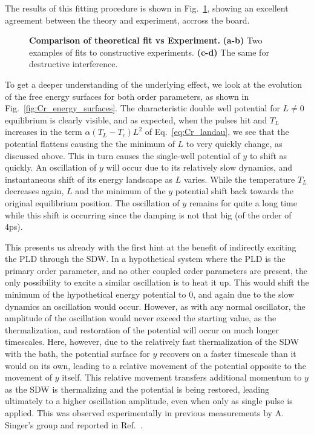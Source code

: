 The results of this fitting procedure is shown in Fig.~\ref{fig:Cr_theoretical_fit}, showing an excellent agreement between the theory and experiment, accross the board.
\begin{figure}
\caption{\label{fig:Cr_theoretical_fit} {\bf Comparison of theoretical fit vs Experiment.} {\bf (a-b)} Two examples of fits to constructive experiments. {\bf (c-d)} The same for destructive interference.}
\end{figure}

To get a deeper understanding of the underlying effect, we look at the evolution of the free energy surfaces for both order parameters, as shown in Fig.~\ref{fig:Cr_energy_surfaces}.
The characteristic double well potential for $L\neq0$ equilibrium is clearly visible, and as expected, when the pulses hit and $T_L$ increases in the term $\alpha(T_L-T_c)L^2$ of Eq.~\ref{eq:Cr_landau}, we see that the potential flattens causing the the minimum of $L$ to very quickly change, as discussed above.
This in turn causes the single-well potential of $y$ to shift as quickly.
An oscillation of $y$ will occur due to its relatively slow dynamics, and instantaneous shift of its energy landscape as $L$ varies.
While the temperature $T_L$ decreases again, $L$ and the minimum of the $y$ potential shift back towards the original equilibrium position.
The oscillation of $y$ remains for quite a long time while this shift is occurring since the damping is not that big (of the order of 4ps).

This presents us already with the first hint at the benefit of indirectly exciting the PLD through the SDW.
In a hypothetical system where the PLD is the primary order parameter, and no other coupled order parameters are present, the only possibility to excite a similar oscillation is to heat it up.
This would shift the minimum of the hypothetical energy potential to 0, and again due to the slow dynamics an oscillation would occur.
However, as with any normal oscillator, the amplitude of the oscillation would never exceed the starting value, as the thermalization, and restoration of the potential will occur on much longer timescales.
Here, however, due to the relatively fast thermalization of the SDW with the bath, the potential surface for $y$ recovers on a faster timescale than it would on its own, leading to a relative movement of the potential opposite to the movement of $y$ itself.
This relative movement transfers additional momentum to $y$ as the SDW is thermalizing and the potential is being restored, leading ultimately to a higher oscillation amplitude, even when only as single pulse is applied.
This was observed experimentally in previous measurements by A. Singer's group and reported in Ref.~\cite{Singer2015}. 

